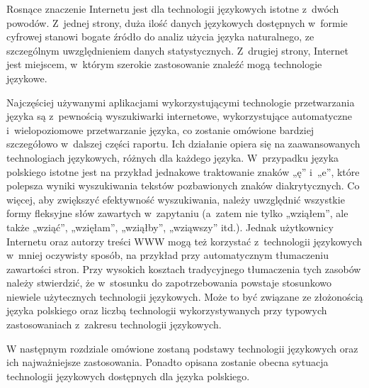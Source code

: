 \begin{multicols}{2}
Rosnące znaczenie Internetu jest dla technologii językowych istotne
z~dwóch powodów. Z~jednej strony, duża ilość danych językowych
dostępnych w~formie cyfrowej stanowi bogate źródło do analiz
użycia języka naturalnego, ze szczególnym uwzględnieniem danych
statystycznych. Z~drugiej strony, Internet jest miejscem, w~którym
szerokie zastosowanie znaleźć mogą technologie językowe. 

Najczęściej używanymi aplikacjami wykorzystującymi technologie
przetwarzania języka są z~pewnością wyszukiwarki internetowe,
wykorzystujące automatyczne i~wielopoziomowe przetwarzanie języka,
co zostanie omówione bardziej szczegółowo w~dalszej części
raportu. Ich działanie opiera się na zaawansowanych technologiach
językowych, różnych dla każdego języka. W~przypadku języka
polskiego istotne jest na przykład jednakowe traktowanie znaków
„ę” i~„e”, które polepsza wyniki wyszukiwania tekstów
pozbawionych znaków diakrytycznych. Co więcej, aby zwiększyć
efektywność wyszukiwania, należy uwzględnić wszystkie formy
fleksyjne słów zawartych w~zapytaniu (a~zatem nie tylko
„wziąłem”, ale także „wziąć”, „wzięłam”,
„wziąłby”, „wziąwszy” itd.). Jednak użytkownicy Internetu
oraz autorzy treści WWW mogą też korzystać z~technologii
językowych w~mniej oczywisty sposób, na przykład przy automatycznym
tłumaczeniu zawartości stron. Przy wysokich kosztach tradycyjnego
tłumaczenia tych zasobów należy stwierdzić, że w~stosunku do
zapotrzebowania powstaje stosunkowo niewiele użytecznych technologii
językowych. Może to być związane ze złożonością języka
polskiego oraz liczbą technologii wykorzystywanych przy typowych
zastosowaniach z~zakresu technologii językowych. 

W następnym rozdziale omówione zostaną podstawy technologii
językowych oraz ich najważniejsze zastosowania. Ponadto opisana
zostanie obecna sytuacja technologii językowych dostępnych dla
języka polskiego. 

\end{multicols} 

\clearpage 




